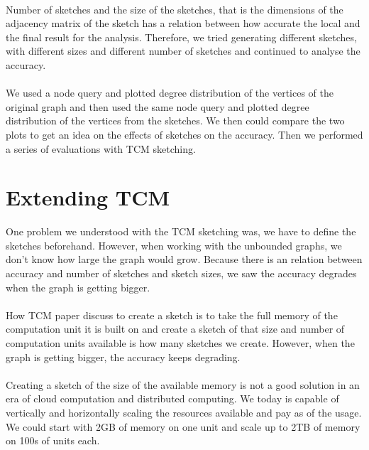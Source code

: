 \documentclass[12pt]{report}
\numberwithin{figure}{section}
\numberwithin{table}{section}
\begin{document}
\paragraph{}

Number of sketches and the size of the sketches, that is the dimensions of the adjacency matrix of the sketch has a relation between how accurate the local and the final result for the analysis. Therefore, we tried generating different sketches, with different sizes and different number of sketches and continued to analyse the accuracy. 

\paragraph{}

We used a node query and plotted degree distribution of the vertices of the original graph and then used the same node query and plotted degree distribution of the vertices from the sketches. We then could compare the two plots to get an idea on the effects of sketches on the accuracy.  Then we performed a series of evaluations with TCM sketching. 

\section{Extending TCM}

One problem we understood with the TCM sketching was, we have to define the sketches beforehand. However, when working with the unbounded graphs, we don’t know how large the graph would grow. Because there is an relation between accuracy and number of sketches and sketch sizes, we saw the accuracy degrades when the graph is getting bigger. 

\paragraph{}

How TCM paper discuss to create a sketch is to take the full memory of the computation unit it is built on and create a sketch of that size and number of computation units available is how many sketches we create. However, when the graph is getting bigger, the accuracy keeps degrading. 

\paragraph{}

Creating a sketch of the size of the available memory is not a good solution in an era of cloud computation and distributed computing. We today is capable of vertically and horizontally scaling the resources available and pay as of the usage. We could start with 2GB of memory on one unit and scale up to 2TB of memory on 100s of units each.
\end{document}

